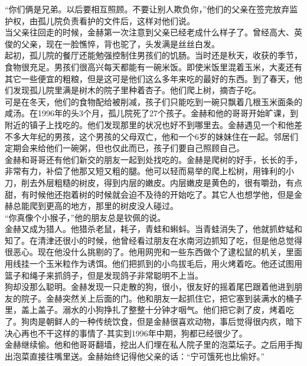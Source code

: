 “你们俩是兄弟。以后要相互照顾。不要让别人欺负你，”他们的父亲在签完放弃监护权，由孤儿院负责看护的文件后，这样对他们说。\\

当父亲往回走的时候，金赫第一次注意到父亲已经老成什么样子了。曾经高大、英俊的父亲，现在一脸憔悴，背也驼了，头发满是丝丝白发。\\

起初，孤儿院的餐厅还能勉强控制住男孩们的饥肠。当时还是秋天，收获的季节，食物很充足。男孩们很高兴每天都能有一碗米饭。即使米饭里混着玉米，大麦还有其它一些便宜的粗粮，但是这可是他们这么多年来吃的最好的东西。到了春天，他们发现孤儿院里满是树木的院子里种着杏子。他们爬上树，摘杏子吃。\\

可是在冬天，他们的食物配给被削减，孩子们只能吃到一碗只飘着几根玉米面条的咸汤。在1996年的头3个月，孤儿院死了27个孩子。金赫和他的哥哥开始旷课，到附近的镇子上找吃的。他们发现那里的状况也好不到哪里去。金赫遇见一个和他差不多大年纪的男孩，这个男孩的父母双亡，他和一个6岁的妹妹住在一起。邻居们定期会来给他们一碗粥，但也仅此而已，孩子们要自己照顾自己。\\

金赫和哥哥还有他们新交的朋友一起到处找吃的。金赫是爬树的好手，长长的手，非常有力，补偿了他那又短又粗的腿。他可以轻而易举的爬上松树，用锋利的小刀，削去外层粗糙的树皮，得到内层的嫩皮。内层嫩皮是黄色的，很有嚼劲，有点甜，有时候他还抱着树的时候就会迫不及待的开始吃了。其它人也想学他，但是金赫总能爬到更高的地方，那里的树皮没人碰过。\\

“你真像个小猴子，”他的朋友总是钦佩的说。\\

金赫又成为猎人。他猎杀老鼠，耗子，青蛙和蝌蚪。当青蛙消失了，他就抓蚱蜢和知了。在清津还很小的时候，他曾经看过朋友在水南河边抓知了吃，但是他总觉得很恶心。现在他没什么挑剔的了。他用网兜和一些东西做个了逮松鼠的机关，里面用线挂一个玉米粒作为诱饵。他们把抓到的小鸟拔毛后，用火烤着吃。他还试图用篮子和绳子来抓鸽子，但是发现鸽子非常聪明不上当。\\

狗却没那么聪明。金赫发现一只走散的狗，很小，很友好的摇着尾巴跟着他进到朋友的院子。金赫突然关上后面的门。他和朋友一起抓住它，把它塞到装满水的桶子里，盖上盖子。溺水的小狗挣扎了整整十分钟才咽气。他们把它剥了皮，烤着吃了。狗肉是朝鲜人的一种传统饮食，但是金赫很喜欢动物，事后觉得很内疚，暗下决心再也不干这样的事情了-其实到1996年中期，狗都已经很少了。\\

金赫继续偷。他和他哥哥翻墙，挖出人们埋在私人院子里的泡菜坛子。之后用手掏出泡菜直接往嘴里送。金赫始终记得他父亲的话：“宁可饿死也比偷好。”\\


